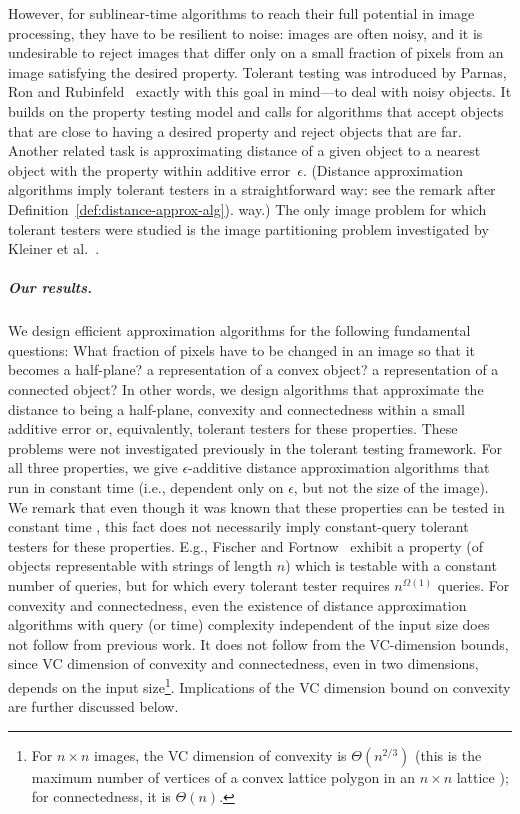 \documentclass[11pt,english]{article}
\numberwithin{figure}{section}
\newcommand{\mydelta}{\epsilon} \newcommand{\bigdelta}{{\epsilon_0}} \newcommand{\dsquares}{d_{\rm squares}}
\begin{document}
However, for sublinear-time algorithms to reach their full potential in image processing, they have to be resilient to noise: images are often noisy, and it is undesirable to reject images that differ only on a small fraction of pixels from an image satisfying the desired property. Tolerant testing was introduced by Parnas, Ron and Rubinfeld~\cite{PRR06}  exactly with this goal in mind---to deal with noisy objects. It builds on the property testing model and calls for algorithms that accept objects that are close to having a desired property and reject objects that are far. Another related task is approximating distance of a given object to a nearest object with the property within additive error~$\mydelta$. (Distance approximation algorithms imply tolerant testers in a straightforward
\ifnum{}
way: see the remark after Definition~\ref{def:distance-approx-alg}).
\else
way.)
\fi
The only image problem for which tolerant testers were studied is the image partitioning problem investigated by Kleiner et al.~\cite{KleinerKNB11}.
\subparagraph{Our results.}
We design efficient approximation algorithms for the following fundamental questions: What fraction of pixels have to be changed in an image so that it becomes a half-plane? a representation of a convex object? a representation of a connected object?
In other words, we design algorithms that approximate the distance to being a half-plane, convexity and connectedness within a small additive error or, equivalently, tolerant testers for these properties. These problems were not investigated previously in the tolerant testing framework.
For all three properties, we give $\mydelta$-additive distance approximation algorithms that run in constant time (i.e., dependent only on $\mydelta$, but not the size of the image). We remark that even though it was known that these properties can be tested in constant time \cite{Ras03}, this fact does not necessarily imply constant-query tolerant testers for these properties. E.g., Fischer and Fortnow~\cite{FischerF06} exhibit a property (of objects representable with strings of length $n$) which is testable with a constant number of queries, but for which every tolerant tester requires $n^{\Omega(1)}$ queries.
For convexity and connectedness, even the existence of distance approximation algorithms with query (or time) complexity independent of the input size does not follow from previous work. It does not follow from the VC-dimension bounds, since VC dimension of convexity and connectedness, even in two dimensions, depends on the input size\footnote{For $n\times n$ images, the VC dimension of convexity is $\Theta(n^{2/3})$ (this is the maximum number of vertices of a convex lattice polygon in an $n\times n$ lattice \cite{Barany00}); for connectedness, it is $\Theta(n)$.}. Implications of the VC dimension bound on convexity are further discussed below.
\end{document}
